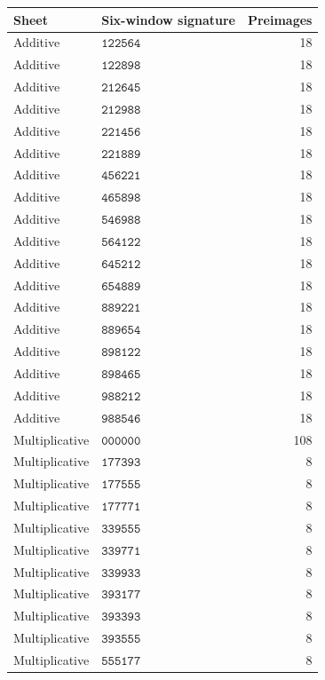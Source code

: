 \begin{longtable}{@{}llr@{}}
\toprule Sheet&Six-window signature&Preimages\\\midrule\endhead
Additive&\(\mathtt{122564}\)&18\\
Additive&\(\mathtt{122898}\)&18\\
Additive&\(\mathtt{212645}\)&18\\
Additive&\(\mathtt{212988}\)&18\\
Additive&\(\mathtt{221456}\)&18\\
Additive&\(\mathtt{221889}\)&18\\
Additive&\(\mathtt{456221}\)&18\\
Additive&\(\mathtt{465898}\)&18\\
Additive&\(\mathtt{546988}\)&18\\
Additive&\(\mathtt{564122}\)&18\\
Additive&\(\mathtt{645212}\)&18\\
Additive&\(\mathtt{654889}\)&18\\
Additive&\(\mathtt{889221}\)&18\\
Additive&\(\mathtt{889654}\)&18\\
Additive&\(\mathtt{898122}\)&18\\
Additive&\(\mathtt{898465}\)&18\\
Additive&\(\mathtt{988212}\)&18\\
Additive&\(\mathtt{988546}\)&18\\
Multiplicative&\(\mathtt{000000}\)&108\\
Multiplicative&\(\mathtt{177393}\)&8\\
Multiplicative&\(\mathtt{177555}\)&8\\
Multiplicative&\(\mathtt{177771}\)&8\\
Multiplicative&\(\mathtt{339555}\)&8\\
Multiplicative&\(\mathtt{339771}\)&8\\
Multiplicative&\(\mathtt{339933}\)&8\\
Multiplicative&\(\mathtt{393177}\)&8\\
Multiplicative&\(\mathtt{393393}\)&8\\
Multiplicative&\(\mathtt{393555}\)&8\\
Multiplicative&\(\mathtt{555177}\)&8\\

\end{longtable}
